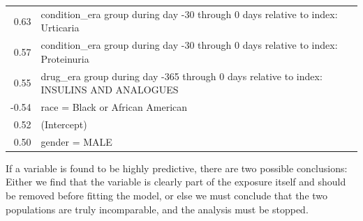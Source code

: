 \documentclass[11pt]{book}
\let\BeginKnitrBlock\begin \let\EndKnitrBlock\end
\begin{document}
\begin{longtable}[]{@{}rl@{}}
\begin{minipage}[t]{0.07\columnwidth}\raggedleft\strut
0.63\strut
\end{minipage} & \begin{minipage}[t]{0.87\columnwidth}\raggedright\strut
condition\_era group during day -30 through 0 days relative to index:
Urticaria\strut
\end{minipage}\tabularnewline
\begin{minipage}[t]{0.07\columnwidth}\raggedleft\strut
0.57\strut
\end{minipage} & \begin{minipage}[t]{0.87\columnwidth}\raggedright\strut
condition\_era group during day -30 through 0 days relative to index:
Proteinuria\strut
\end{minipage}\tabularnewline
\begin{minipage}[t]{0.07\columnwidth}\raggedleft\strut
0.55\strut
\end{minipage} & \begin{minipage}[t]{0.87\columnwidth}\raggedright\strut
drug\_era group during day -365 through 0 days relative to index:
INSULINS AND ANALOGUES\strut
\end{minipage}\tabularnewline
\begin{minipage}[t]{0.07\columnwidth}\raggedleft\strut
-0.54\strut
\end{minipage} & \begin{minipage}[t]{0.87\columnwidth}\raggedright\strut
race = Black or African American\strut
\end{minipage}\tabularnewline
\begin{minipage}[t]{0.07\columnwidth}\raggedleft\strut
0.52\strut
\end{minipage} & \begin{minipage}[t]{0.87\columnwidth}\raggedright\strut
(Intercept)\strut
\end{minipage}\tabularnewline
\begin{minipage}[t]{0.07\columnwidth}\raggedleft\strut
0.50\strut
\end{minipage} & \begin{minipage}[t]{0.87\columnwidth}\raggedright\strut
gender = MALE\strut
\end{minipage}\tabularnewline
\bottomrule
\end{longtable}

\BeginKnitrBlock{rmdimportant}
If a variable is found to be highly predictive, there are two possible
conclusions: Either we find that the variable is clearly part of the
exposure itself and should be removed before fitting the model, or else
we must conclude that the two populations are truly incomparable, and
the analysis must be stopped.
\EndKnitrBlock{rmdimportant}
\end{document}
